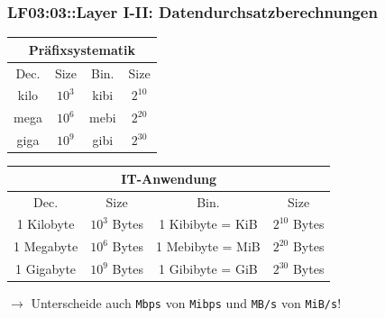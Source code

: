 \begin{frame}  
  \frametitle{LF03:03::Layer I-II: Datendurchsatzberechnungen }

  \begin{center}
  \begin{footnotesize}

  \renewcommand{\arraystretch}{1.5}
  \begin{tabular}{|c|c|c|c|}
    \multicolumn{4}{c}{Präfixsystematik}  \\
    \hline
    Dec. & Size & Bin. & Size \\
    \hline
    \hline
    kilo & $10^3$ & kibi &  $2^{10}$ \\
    \hline
    mega & $10^6$ & mebi &  $2^{20}$  \\
    \hline
    giga & $10^9$ & gibi &  $2^{30}$  \\
    \hline
  \end{tabular}

  \vspace{0.4cm}
  \renewcommand{\arraystretch}{1.5}
  \begin{tabular}{|c|c|c|c|}
    \multicolumn{4}{c}{IT-Anwendung} \\
    \hline
    Dec. & Size & Bin. & Size\\
    \hline
    \hline
    1 Kilobyte &  $10^3$ Bytes & 1 Kibibyte = KiB & $2^{10}$ Bytes \\
    \hline
    1 Megabyte &  $10^6$ Bytes & 1 Mebibyte = MiB & $2^{20}$ Bytes \\
    \hline
    1 Gigabyte &  $10^9$ Bytes & 1 Gibibyte = GiB & $2^{30}$ Bytes \\
    \hline
  \end{tabular}

\end{footnotesize}
\end{center}

\vspace{0.1cm}
$\rightarrow$ Unterscheide auch \texttt{Mbps} von \texttt{Mibps} und \texttt{MB/s} von \texttt{MiB/s}!

\end{frame}

